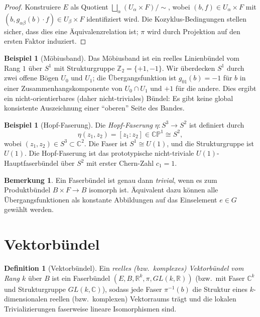 \documentclass[12pt,a4paper]{amsart}
\theoremstyle{definition}
\newtheorem{definition}[theorem]{Definition}
\newtheorem{example}[theorem]{Beispiel}
\newtheorem{remark}[theorem]{Bemerkung}
\begin{document}
\begin{proof}
Konstruiere $E$ als Quotient
$\bigsqcup_\alpha (U_\alpha \times F) / {\sim}$,
wobei $(b, f) \in U_\alpha \times F$ mit $(b, g_{\alpha\beta}(b) \cdot f)
\in U_\beta \times F$ identifiziert wird. Die Kozyklus-Bedingungen stellen
sicher, dass dies eine Äquivalenzrelation ist; $\pi$ wird durch Projektion auf
den ersten Faktor induziert.
\end{proof}

\begin{example}[Möbiusband]
Das Möbiusband ist ein reelles Linienbündel vom Rang $1$ über $S^1$ mit
Strukturgruppe $\mathbb{Z}_2 = \{+1, -1\}$. Wir überdecken $S^1$ durch zwei
offene Bögen $U_0$ und $U_1$; die Übergangsfunktion ist $g_{01}(b) = -1$ für
$b$ in einer Zusammenhangskomponente von $U_0 \cap U_1$ und $+1$ für die andere.
Dies ergibt ein nicht-orientierbares (daher nicht-triviales) Bündel: Es gibt
keine global konsistente Auszeichnung einer ``oberen'' Seite des Bandes.
\end{example}

\begin{example}[Hopf-Faserung]
Die \emph{Hopf-Faserung} $\eta \colon S^3 \to S^2$ ist definiert durch
\[
  \eta(z_1, z_2) = [z_1 : z_2] \in \mathbb{CP}^1 \cong S^2,
\]
wobei $(z_1, z_2) \in S^3 \subset \mathbb{C}^2$. Die Faser ist $S^1 \cong U(1)$,
und die Strukturgruppe ist $U(1)$. Die Hopf-Faserung ist das prototypische
nicht-triviale $U(1)$-Hauptfaserbündel über $S^2$ mit erster Chern-Zahl $c_1 = 1$.
\end{example}

\begin{remark}
Ein Faserbündel ist genau dann \emph{trivial}, wenn es zum Produktbündel
$B \times F \to B$ isomorph ist. Äquivalent dazu können alle Übergangsfunktionen
als konstante Abbildungen auf das Einselement $e \in G$ gewählt werden.
\end{remark}

\section{Vektorbündel}
\label{sec:vektor}

\begin{definition}[Vektorbündel]
Ein \emph{reelles (bzw.\ komplexes) Vektorbündel vom Rang $k$} über $B$ ist ein
Faserbündel $(E, B, \mathbb{R}^k, \pi, GL(k,\mathbb{R}))$ (bzw.\ mit Faser
$\mathbb{C}^k$ und Strukturgruppe $GL(k,\mathbb{C})$), sodass jede Faser
$\pi^{-1}(b)$ die Struktur eines $k$-dimensionalen reellen (bzw.\ komplexen)
Vektorraums trägt und die lokalen Trivializierungen faserweise lineare
Isomorphismen sind.
\end{definition}
\end{document}
